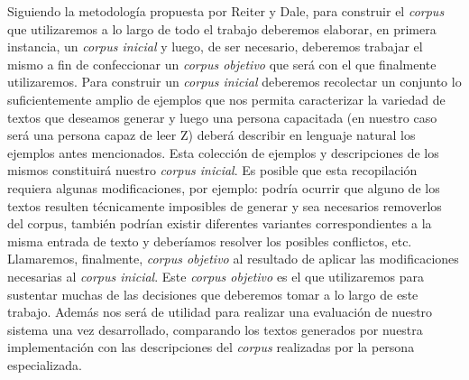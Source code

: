 Siguiendo la metodología propuesta por Reiter y Dale, para construir el \emph{corpus} que utilizaremos a lo largo de todo el trabajo deberemos elaborar, en primera instancia, un \emph{corpus inicial} y luego, de ser necesario, deberemos trabajar el mismo a fin de confeccionar un \emph{corpus objetivo} que será con el que finalmente utilizaremos. Para construir un \emph{corpus inicial} deberemos recolectar un conjunto lo suficientemente amplio de ejemplos que nos permita caracterizar la variedad de textos que deseamos generar y luego una persona capacitada (en nuestro caso será una persona capaz de leer Z) deberá describir en lenguaje natural los ejemplos antes mencionados. Esta colección de ejemplos y descripciones de los mismos constituirá nuestro \emph{corpus inicial}. Es posible que esta recopilación requiera algunas modificaciones, por ejemplo: podría ocurrir que alguno de los textos resulten técnicamente imposibles de generar y sea necesarios removerlos del corpus, también podrían existir diferentes variantes correspondientes a la misma entrada de texto y deberíamos resolver los posibles conflictos, etc. Llamaremos, finalmente, \emph{corpus objetivo} al resultado de aplicar las modificaciones necesarias al \emph{corpus inicial}. Este \emph{corpus objetivo} es el que utilizaremos para sustentar muchas de las decisiones que deberemos tomar a lo largo de este trabajo. Además nos será de utilidad para realizar una evaluación de nuestro sistema una vez desarrollado, comparando los textos generados por nuestra implementación con las descripciones del \emph{corpus} realizadas por la persona especializada.

